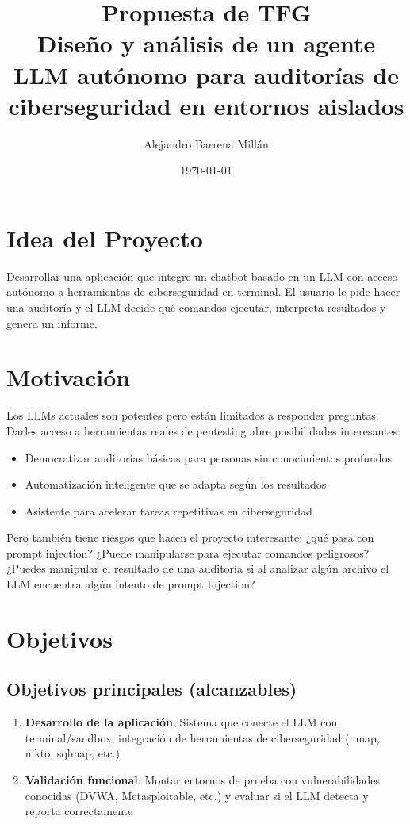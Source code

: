 \documentclass[12pt,a4paper]{article}
\title{\textbf{Propuesta de TFG}\\[0.5em]
\large Diseño y análisis de un agente LLM autónomo para auditorías de ciberseguridad en entornos aislados}
\author{Alejandro Barrena Millán}
\date{\today}
\begin{document}
\maketitle

\section{Idea del Proyecto}

Desarrollar una aplicación que integre un chatbot basado en un LLM con acceso autónomo a herramientas de ciberseguridad en terminal. El usuario le pide hacer una auditoría y el LLM decide qué comandos ejecutar, interpreta resultados y genera un informe.

\section{Motivación}

Los LLMs actuales son potentes pero están limitados a responder preguntas. Darles acceso a herramientas reales de pentesting abre posibilidades interesantes:
\begin{itemize}[leftmargin=*]
    \item Democratizar auditorías básicas para personas sin conocimientos profundos
    \item Automatización inteligente que se adapta según los resultados
    \item Asistente para acelerar tareas repetitivas en ciberseguridad
\end{itemize}

Pero también tiene riesgos que hacen el proyecto interesante: ¿qué pasa con prompt injection? ¿Puede manipularse para ejecutar comandos peligrosos? ¿Puedes manipular el resultado de una auditoría si al analizar algún archivo el LLM encuentra algún intento de prompt Injection?

\section{Objetivos}

\subsection{Objetivos principales (alcanzables)}

\begin{enumerate}[leftmargin=*]
    \item \textbf{Desarrollo de la aplicación}: Sistema que conecte el LLM con terminal/sandbox, integración de herramientas de ciberseguridad (nmap, nikto, sqlmap, etc.)
    
    \item \textbf{Validación funcional}: Montar entornos de prueba con vulnerabilidades conocidas (DVWA, Metasploitable, etc.) y evaluar si el LLM detecta y reporta correctamente
\end{enumerate}
\end{document}
